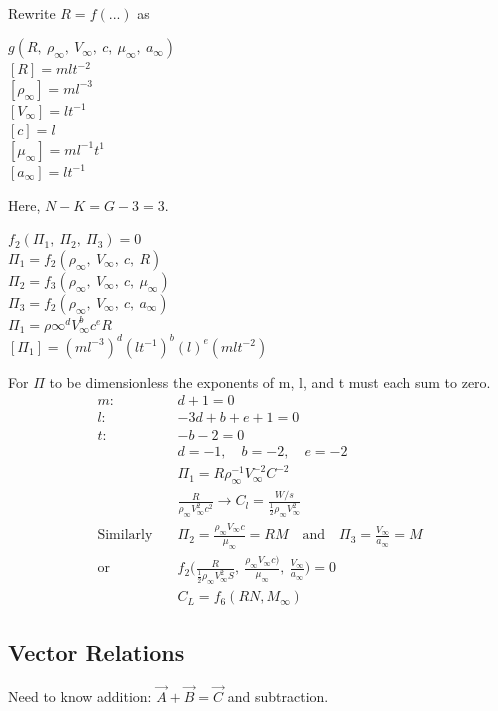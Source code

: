 \documentclass[draft=false, titlepage]{article}
\begin{document}
\paragraph*{} Rewrite $R=f(...)$ as
\begin{center}
    $g(R,\ \rho_\infty,\ V_\infty,\ c,\ \mu_\infty,\ a_\infty)$\\
    $[R] = mlt^{-2}$\\
    $[\rho_\infty] = ml^{-3}$\\
    $[V_\infty] = lt^{-1}$\\
    $[c] = l$\\
    $[\mu_\infty] = ml^{-1}t^1$\\
    $[a_\infty] = lt^{-1}$
\end{center}
Here, $N-K=G-3=3$.
\begin{center}
    $f_2(\Pi_1,\ \Pi_2,\ \Pi_3) = 0$\\
    $\Pi_1 = f_2(\rho_\infty,\ V_\infty,\ c,\ R)$\\
    $\Pi_2 = f_3(\rho_\infty,\ V_\infty,\ c,\ \mu_\infty)$\\
    $\Pi_3 = f_2(\rho_\infty,\ V_\infty,\ c,\ a_\infty)$\\
    $\Pi_1 = \rho\infty^d V_\infty^b c^e R$\\
    $[\Pi_1] = (ml^{-3})^d(lt^{-1})^b(l)^e(mlt^{-2})$
\end{center}
For $\Pi$ to be dimensionless the exponents of m, l, and t must each sum to zero.
\begin{align*}
    m:\ & d + 1 = 0\\
    l:\ & -3d + b + e + 1 = 0\\
    t:\ & -b -2 = 0\\
    & d=-1,\quad b=-2,\quad e=-2\\
    & \Pi_1 = R\rho_\infty^{-1}V_\infty^{-2}C^{-2}\\
    & \frac{R}{\rho_\infty V_\infty^2 c^2} \rightarrow C_l = \frac{W/s}{\frac{1}{2}\rho_\infty V_\infty^2}\\
    \text{Similarly} \quad& \Pi_2 = \frac{\rho_\infty V_\infty c}{\mu_\infty} = RM
    \quad\text{and}\quad
    \Pi_3 = \frac{V_\infty}{a_\infty} = M\\
    \text{or} \quad& f_2\Big(\frac{R}{\frac{1}{2}\rho_\infty V_\infty^2 S},\ \frac{\rho_\infty V_\infty c)}{\mu_\infty},\ \frac{V_\infty}{a_\infty}\Big) = 0\\
    & C_L = f_6(RN, M_\infty)
\end{align*}

\subsection{Vector Relations}
Need to know addition: $\vec{A} + \vec{B} = \vec{C}$ and subtraction.
\end{document}
